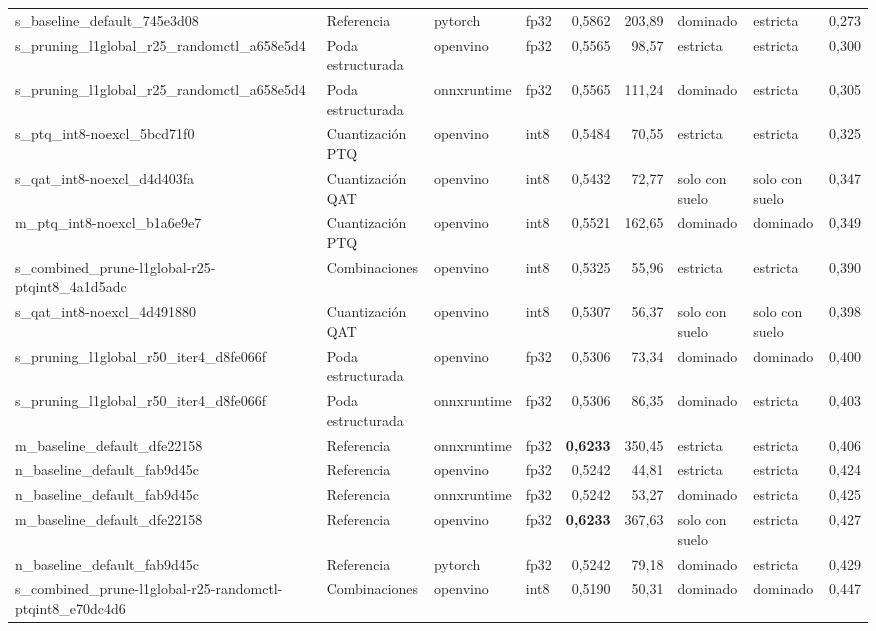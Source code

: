 \begin{landscape}
\begin{table}[htbp]
\begin{adjustbox}{max width=\linewidth, max totalheight=\dimexpr\textheight-\ht\tfmedgetitle-\dp\tfmedgetitle-\ht\tfmedgenotes-\dp\tfmedgenotes-6pt\relax}
\begin{tabular}{llllrrllr}
    s\_baseline\_default\_745e3d08 & Referencia & pytorch & fp32 & 0,5862 & 203,89 & dominado & estricta & 0,273 \\
    s\_pruning\_l1global\_r25\_randomctl\_a658e5d4 & Poda estructurada & openvino & fp32 & 0,5565 & 98,57 & estricta & estricta & 0,300 \\
    s\_pruning\_l1global\_r25\_randomctl\_a658e5d4 & Poda estructurada & onnxruntime & fp32 & 0,5565 & 111,24 & dominado & estricta & 0,305 \\
    s\_ptq\_int8-noexcl\_5bcd71f0 & Cuantización PTQ & openvino & int8 & 0,5484 & 70,55 & estricta & estricta & 0,325 \\
    s\_qat\_int8-noexcl\_d4d403fa & Cuantización QAT & openvino & int8 & 0,5432 & 72,77 & solo con suelo & solo con suelo & 0,347 \\
    m\_ptq\_int8-noexcl\_b1a6e9e7 & Cuantización PTQ & openvino & int8 & 0,5521 & 162,65 & dominado & dominado & 0,349 \\
    s\_combined\_prune-l1global-r25-ptqint8\_4a1d5adc & Combinaciones & openvino & int8 & 0,5325 & 55,96 & estricta & estricta & 0,390 \\
    s\_qat\_int8-noexcl\_4d491880 & Cuantización QAT & openvino & int8 & 0,5307 & 56,37 & solo con suelo & solo con suelo & 0,398 \\
    s\_pruning\_l1global\_r50\_iter4\_d8fe066f & Poda estructurada & openvino & fp32 & 0,5306 & 73,34 & dominado & dominado & 0,400 \\
    s\_pruning\_l1global\_r50\_iter4\_d8fe066f & Poda estructurada & onnxruntime & fp32 & 0,5306 & 86,35 & dominado & estricta & 0,403 \\
    m\_baseline\_default\_dfe22158 & Referencia & onnxruntime & fp32 & \textbf{0,6233} & 350,45 & estricta & estricta & 0,406 \\
    n\_baseline\_default\_fab9d45c & Referencia & openvino & fp32 & 0,5242 & 44,81 & estricta & estricta & 0,424 \\
    n\_baseline\_default\_fab9d45c & Referencia & onnxruntime & fp32 & 0,5242 & 53,27 & dominado & estricta & 0,425 \\
    m\_baseline\_default\_dfe22158 & Referencia & openvino & fp32 & \textbf{0,6233} & 367,63 & solo con suelo & estricta & 0,427 \\
    n\_baseline\_default\_fab9d45c & Referencia & pytorch & fp32 & 0,5242 & 79,18 & dominado & estricta & 0,429 \\
    s\_combined\_prune-l1global-r25-randomctl-ptqint8\_e70dc4d6 & Combinaciones & openvino & int8 & 0,5190 & 50,31 & dominado & dominado & 0,447 \\

\end{tabular}
\end{adjustbox}
\end{table}
\end{landscape}
